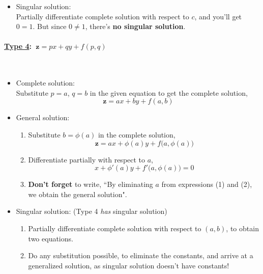 \documentclass{article}
\newcommand{\para}[1]{\paragraph{#1}\mbox{}\\}
\begin{document}
{\begin{itemize}
\begin{enumerate}[1)]
\end{enumerate}
$\ $
\item Singular solution: \\
Partially differentiate complete solution with respect to {\LARGE $c$}, and you'll get {\LARGE $0=1$}. But since {\LARGE $0\neq 1$}, there's \textbf{no singular solution}.
\end{itemize}
\para{{\Large \underline{Type 4}: {\LARGE $\ \textbf{z}=px+qy+f(p,q)$}}}
\begin{itemize}
\item Complete solution: \\
Substitute {\LARGE $p=a$}, {\LARGE $q=b$} in the given equation to get the complete solution, {\LARGE $$\textbf{z}=ax+by+f(a,b)$$}
\newpage
\item General solution:
\begin{enumerate}[1)]
\item Substitute {\LARGE $b=\phi(a)$} in the complete solution, {\LARGE $$\textbf{z}=ax+\phi(a)y+f\big(a,\phi(a)\big)$$}
\item Differentiate partially with respect to $a$, {\LARGE $$x+\phi'(a)y+f'\big(a,\phi(a)\big)=0$$}
\item \textbf{Don't forget} to write, ``By eliminating {\LARGE $a$} from expressions (1) and (2), we obtain the general solution".
\end{enumerate}
\item Singular solution: (Type 4 \textit{has} singular solution)
\begin{enumerate}[1)]
\item Partially differentiate complete solution with respect to {\LARGE $(a,b)$}, to obtain two equations.
\item Do any substitution possible, to eliminate the constants, and arrive at a generalized solution, as singular solution doesn't have constants!
\end{enumerate}
\end{itemize}
}
\end{document}
